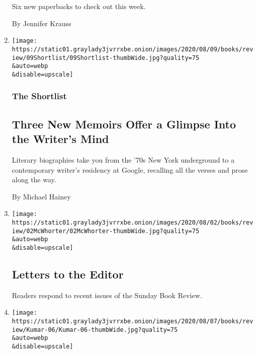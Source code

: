 \begin{enumerate}
  Six new paperbacks to check out this week.

  By Jennifer Krauss
\item
  \href{/2020/08/07/books/review/three-new-memoirs-offer-a-glimpse-into-the-writers-mind.html}{}

  \texttt{[image: https://static01.graylady3jvrrxbe.onion/images/2020/08/09/books/review/09Shortlist/09Shortlist-thumbWide.jpg?quality=75\\\&auto=webp\\\&disable=upscale]}

  \hypertarget{the-shortlist}{%
  \subsubsection{The Shortlist}\label{the-shortlist}}

  \hypertarget{three-new-memoirs-offer-a-glimpse-into-the-writers-mind}{%
  \subsection{Three New Memoirs Offer a Glimpse Into the Writer's
  Mind}\label{three-new-memoirs-offer-a-glimpse-into-the-writers-mind}}

  Literary biographies take you from the '70s New York underground to a
  contemporary writer's residency at Google, recalling all the verses
  and prose along the way.

  By Michael Hainey
\item
  \href{/2020/08/07/books/review/letters-to-the-editor.html}{}

  \texttt{[image: https://static01.graylady3jvrrxbe.onion/images/2020/08/02/books/review/02McWhorter/02McWhorter-thumbWide.jpg?quality=75\\\&auto=webp\\\&disable=upscale]}

  \hypertarget{letters-to-the-editor}{%
  \subsection{Letters to the Editor}\label{letters-to-the-editor}}

  Readers respond to recent issues of the Sunday Book Review.
\item
  \href{/2020/08/07/books/zadie-smith-lydia-davis-yiyun-li-mark-doty-jamaica-kincaid-colum-mccann-jenny-offill-tommy-orange.html}{}

  \texttt{[image: https://static01.graylady3jvrrxbe.onion/images/2020/08/07/books/review/Kumar-06/Kumar-06-thumbWide.jpg?quality=75\\\&auto=webp\\\&disable=upscale]}

  \hypertarget{off-the-shelf}{%
}
\end{enumerate}
